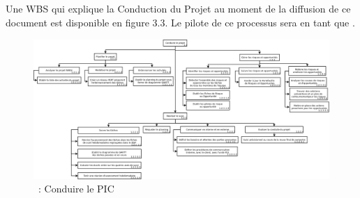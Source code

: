 \subsection{\WBSCourt{}}
\label{ProcessusConduirePic}
Une WBS qui explique la Conduction du Projet au moment de la diffusion de ce document est disponible en figure 3.3.
Le pilote de ce processus sera \Sergi{} en tant que \CP{}.
\newpage
\begin{figure}[H]
\centering
 \includegraphics[width=24cm,angle=90]{images/ConduireLeProjet.png}
 \caption{\WBSCourt{}~: Conduire le PIC}
 \label{WBS3}
\end{figure}


